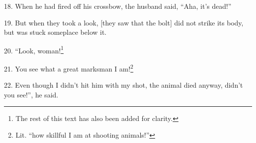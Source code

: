18. When he had fired off his crossbow, the husband said, ``Aha, it's dead!''

19. But when they took a look, [they saw that the bolt] did not strike its body,
but was stuck someplace below it.

20. ``Look, woman!\footnote{The rest of this text has also been added for clarity.}

21. You see what a great marksman I am!\footnote{Lit. ``how skillful I am at shooting animals!''}

22. Even though I didn't hit him with my shot, the animal died anyway, didn't you
see!'', he said.

